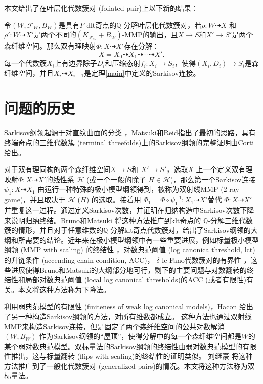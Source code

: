 本文给出了在叶层化代数簇对 (foliated pair)上以下新的结果：
\begin{theorem}\label{mainf}
  令$(W,\mathcal{F}_{W},B_{W})$是具有$F$-dlt奇点的$\mathbb{Q}$-分解叶层化代数簇对，若$\rho:W\dashrightarrow X$ 和$\rho':W \dashrightarrow X'$是两个不同的$(K_{\mathcal{F}_{W}}+B_{W})$-MMP的输出，且$X \to S$和$X' \to S'$是两个森纤维空间。那么双有理映射$\Phi:X \dashrightarrow X'$存在分解：
  \[ X=X_{0}\dashrightarrow X_{1}\dashrightarrow \cdots \dashrightarrow X'. \]
  每一个代数簇$X_{i}$上有边界除子$D_{i}$和压缩态射$f_{i}:X_{i}\to S_{i}$，使得$(X_{i},D_{i})\to S_{i}$是森纤维空间，并且$X_{i} \dashrightarrow X_{i+1}$是定理\ref{main}中定义的Sarkisov连接。
\end{theorem}

\section{问题的历史}
Sarkisov纲领起源于对直纹曲面的分类 \cite{sarkisovBIRATIONALAUTOMORPHISMSCONIC1981,sarkisovCONICBUNDLESTRUCTURES1983}，Matsuki和Reid指出了最初的思路，具有终端奇点的三维代数簇 (terminal threefolds)上的Sarkisov纲领的完整证明由Corti\cite{cortiFactoringBirationalMaps}给出。 

对于双有理同构的两个森纤维空间$X\to S$和 $X'\to S'$，选取$X$ 上一个定义双有理映射$\Phi:X \dashrightarrow X'$的线性系 $\mathcal{H}$ (或一个一般的除子 $H \in \mathcal{H}$)，那么第一个Sarkisov连接 $\psi_1:X\dashrightarrow X_1$ 由运行一种特殊的极小模型纲领得到，被称为双射线MMP ($2$-ray game)，并且取决于 $\mathcal{H}$ ($H$) 的选取。接着用 $\Phi_{1}=\Phi\circ \psi_1^{-1}: X_1 \dashrightarrow X'$替代 $\Phi:X\dashrightarrow X'$并重复这一过程。通过定义Sarkisov次数，并证明在归纳构造中Sarkisov次数下降来说明归纳终结。Bruno和Matsuki \cite{brunoLogSarkisovProgram1995} 将这种方法推广到klt奇点的 $\mathbb{Q}$-分解三维代数簇的情形，并且对于任意维数的$\mathbb{Q}$-分解klt奇点代数簇对，给出了Sarkisov纲领的大纲和所需要的结论。近年来在极小模型纲领中有一些重要进展，例如标量极小模型纲领 (MMP with scaling) 的终结性 \cite{BCHM10}，对数典范阈值 (log canonica threshold, lct)的升链条件 (accending chain condition, ACC)\cite{HMX14}， $\delta$-lc Fano代数簇对的有界性 \cite{Bir19,birkarSingularitiesLinearSystems2020}，这些进展使得Bruno和Matsuki的大纲部分地可行，剩下的主要问题与对数翻转的终结性和局部对数典范阈值 (local log canonical thresholds)的ACC (或者有限性)有关。本文将这种方法称为下降法。


利用弱典范模型的有限性\cite{BCHM10} (finiteness of weak log canonical models)，Hacon \cite{haconMinimalModelProgram2012} 给出了另一种构造Sarkisov纲领的方法，对所有维数都成立。
这种方法也通过双射线MMP来构造Sarkisov连接，但是固定了两个森纤维空间的公共对数解消 $(W,B_W)$ 作为Sarkisov纲领的``屋顶''，使得分解中的每一个森纤维空间都是$W$的某个弱对数典范模型。双标量法的Sarkisov纲领的终结性由弱对数典范模型的有限性推出，这与标量翻转 (flips with scaling)的终结性的证明类似。
刘继豪 \cite{liuSarkisovProgramGeneralized2021} 将这种方法推广到了一般化代数簇对 (generalized pairs)的情况。本文将这种方法称为双标量法。


